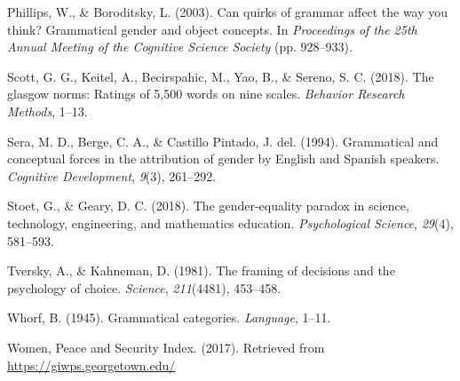 \documentclass[man,floatsintext]{apa6}
\theoremstyle{definition}
\theoremstyle{definition}
\theoremstyle{definition}
\theoremstyle{remark}
\begin{document}
\hypertarget{ref-phillips2003can}{}
Phillips, W., \& Boroditsky, L. (2003). Can quirks of grammar affect the
way you think? Grammatical gender and object concepts. In
\emph{Proceedings of the 25th Annual Meeting of the Cognitive Science
Society} (pp. 928--933).

\hypertarget{ref-scott2018glasgow}{}
Scott, G. G., Keitel, A., Becirspahic, M., Yao, B., \& Sereno, S. C.
(2018). The glasgow norms: Ratings of 5,500 words on nine scales.
\emph{Behavior Research Methods}, 1--13.

\hypertarget{ref-sera1994grammatical}{}
Sera, M. D., Berge, C. A., \& Castillo Pintado, J. del. (1994).
Grammatical and conceptual forces in the attribution of gender by
English and Spanish speakers. \emph{Cognitive Development}, \emph{9}(3),
261--292.

\hypertarget{ref-stoet2018gender}{}
Stoet, G., \& Geary, D. C. (2018). The gender-equality paradox in
science, technology, engineering, and mathematics education.
\emph{Psychological Science}, \emph{29}(4), 581--593.

\hypertarget{ref-tversky1981framing}{}
Tversky, A., \& Kahneman, D. (1981). The framing of decisions and the
psychology of choice. \emph{Science}, \emph{211}(4481), 453--458.

\hypertarget{ref-whorf1945grammatical}{}
Whorf, B. (1945). Grammatical categories. \emph{Language}, 1--11.

\hypertarget{ref-wps}{}
Women, Peace and Security Index. (2017). Retrieved from
\url{https://giwps.georgetown.edu/}

\endgroup
\end{document}
